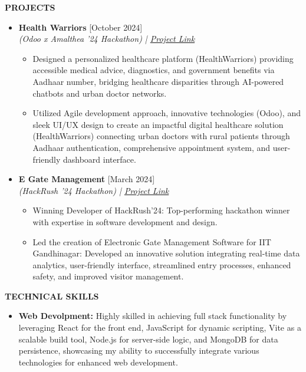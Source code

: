 \documentclass[a4paper,10pt]{article}
\newcommand{\isep}{-2 pt}
\newcommand{\resheading}[1]{{\small \colorbox{mygrey}{\begin{minipage}{0.965\textwidth}{\textbf{#1 \vphantom{p\^{E}}}}\end{minipage}}}}
\begin{document}
\resheading{\textbf{ PROJECTS} }
\vspace{-0.4cm}
\begin{itemize}\itemsep\isep
\item \textbf{Health Warriors} \hfill [October 2024]\\\emph{(Odoo x Amalthea '24 Hackathon) | 
\href{https://github.com/VivekRaj2005/VivekRaj_HealthWarriors}{Project Link}} \\[-0.7cm]
\begin{itemize}\itemsep  \isep
\item Designed a personalized healthcare platform (HealthWarriors) providing accessible medical advice, diagnostics, and government benefits via Aadhaar number, bridging healthcare disparities through AI-powered chatbots and urban doctor networks.
\item Utilized Agile development approach, innovative technologies (Odoo), and sleek UI/UX design to create an impactful digital healthcare solution (HealthWarriors) connecting urban doctors with rural patients through Aadhaar authentication, comprehensive appointment system, and user-friendly dashboard interface.
\end{itemize}\item \textbf{E Gate Management} \hfill [March 2024]\\\emph{(HackRush '24 Hackathon) | 
\href{https://github.com/VivekRaj2005/E-Gate-System}{Project Link}} \\[-0.7cm]
\begin{itemize}\itemsep  \isep
\item Winning Developer of HackRush'24: Top-performing hackathon winner with expertise in software development and design. 
\item Led the creation of Electronic Gate Management Software for IIT Gandhinagar: Developed an innovative solution integrating real-time data analytics, user-friendly interface, streamlined entry processes, enhanced safety, and improved visitor management.
\end{itemize}
\end{itemize}
        
\resheading{\textbf{TECHNICAL SKILLS} }
\vspace{-0.4cm}
\begin{itemize} \itemsep \isep
\item \textbf{Web Devolpment:} Highly skilled in achieving full stack functionality by leveraging React for the front end, JavaScript for dynamic scripting, Vite as a scalable build tool, Node.js for server-side logic, and MongoDB for data persistence, showcasing my ability to successfully integrate various technologies for enhanced web development.

\end{itemize}
\end{document}
